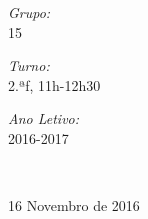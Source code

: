\begin{titlepage}
\begin{center}
\noindent
\begin{minipage}{0.3\textwidth}
\begin{flushleft} \large
\emph{Grupo:} \\ 
15
\end{flushleft}
\end{minipage}
\begin{minipage}{0.3\textwidth}
\begin{center} \large
\emph{Turno:} \\ 
2.ªf, 11h-12h30
\end{center}
\end{minipage}
\begin{minipage}{0.3\textwidth}
\begin{flushright} \large
\emph{Ano Letivo:} \\
2016-2017
\end{flushright}
\end{minipage}
\\[0.5cm]
\vfill

{\large 16 Novembro de 2016}

\end{center}
\end{titlepage}
